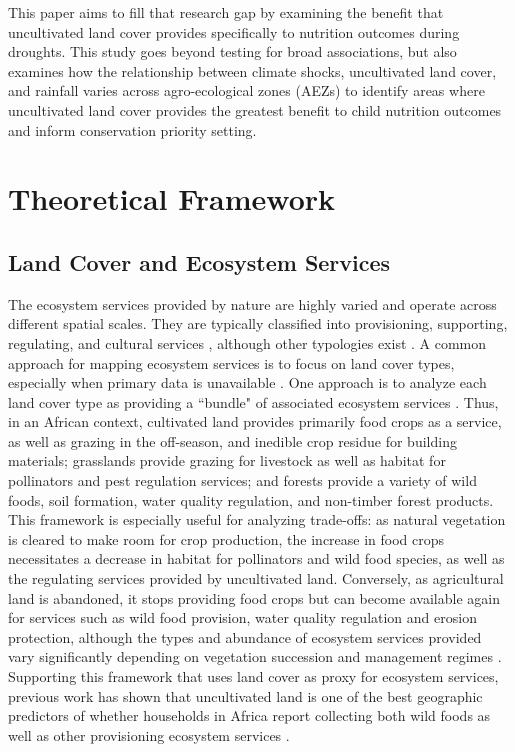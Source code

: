 \documentclass[titlepage]{article}
\begin{document}
This paper aims to fill that research gap by examining the benefit that uncultivated land cover provides specifically to nutrition outcomes during droughts.  This study goes beyond testing for broad associations, but also examines how the relationship between climate shocks, uncultivated land cover, and rainfall varies across agro-ecological zones (AEZs) to identify areas where uncultivated land cover provides the greatest benefit to child nutrition outcomes and inform conservation priority setting.

\section{Theoretical Framework}

\subsection{Land Cover and Ecosystem Services}
The ecosystem services provided by nature are highly varied and operate across different spatial scales.  They are typically classified into provisioning, supporting, regulating, and cultural services \citep{Martinez-Harms2012}, although other typologies exist \citep{Fisher2008}.  A common approach for mapping ecosystem services is to focus on land cover types, especially when primary data is unavailable \citep{Martinez-Harms2012}.  One approach is to analyze each land cover type as providing a ``bundle" of associated ecosystem services \citep{Raudsepp-Hearne2010}.  Thus, in an African context, cultivated land provides primarily food crops as a service, as well as grazing in the off-season, and inedible crop residue for building materials; grasslands provide grazing for livestock as well as habitat for pollinators and pest regulation services; and forests provide a variety of wild foods, soil formation, water quality regulation, and non-timber forest products.  This framework is especially useful for analyzing trade-offs: as natural vegetation is cleared to make room for crop production, the increase in food crops necessitates a decrease in habitat for pollinators and wild food species, as well as the regulating services provided by uncultivated land.  Conversely, as agricultural land is abandoned, it stops providing food crops but can become available again for services such as wild food provision, water quality regulation and erosion protection, although the types and abundance of ecosystem services provided vary significantly depending on vegetation succession and management regimes \citep{wessels2019mapping}.  Supporting this framework that uses land cover as proxy for ecosystem services, previous work has shown that uncultivated land is one of the best geographic predictors of whether households in Africa report collecting both wild foods as well as other provisioning ecosystem services \citep{Cooper2018a}.
\end{document}
